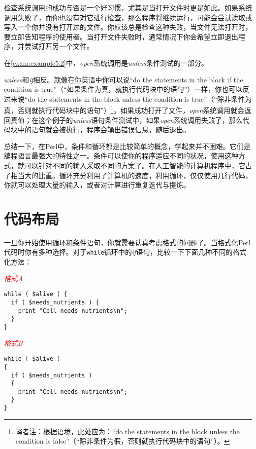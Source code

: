 检查系统调用的成功与否是一个好习惯，尤其是当打开文件时更是如此。如果系统调用失败了，而你也没有对它进行检查，那么程序将继续运行，可能会尝试读取或写入一个你并没有打开过的文件。你应该总是检查这种失败，当文件无法打开时，要立即告知程序的使用者。当打开文件失败时，通常情况下你会希望立即退出程序，并尝试打开另一个文件。

在\autoref{exam:example5.2}中，\textit{open}系统调用是\textit{unless}条件测试的一部分。

\textit{unless}和\textit{if}相反。就像在你英语中你可以说“do the statements in the block if the condition is true”（“如果条件为真，就执行代码块中的语句”）一样，你也可以反过来说“do the statements in the block unless the condition is true”（“除非条件为真，否则就执行代码块中的语句”）\footnote{译者注：根据语境，此处应为：“do the statements in the block unless the condition is false”（“除非条件为假，否则就执行代码块中的语句”）。}。如果成功打开了文件，\textit{open}系统调用就会返回真值；在这个例子的\textit{unless}语句条件测试中，如果\textit{open}系统调用失败了，那么代码块中的语句就会被执行，程序会输出错误信息，随后退出。

总结一下，在Perl中，条件和循环都是比较简单的概念，学起来并不困难。它们是编程语言最强大的特性之一。条件可以使你的程序适应不同的状况，使用这种方式，就可以针对不同的输入采取不同的方案了。在人工智能的计算机程序中，它占了相当大的比重。循环充分利用了计算机的速度，利用循环，仅仅使用几行代码，你就可以处理大量的输入，或者对计算进行重复迭代与提炼。

\section{代码布局}
\label{sect:section5.2}
一旦你开始使用循环和条件语句，你就需要认真考虑格式的问题了。当格式化Perl代码时你有多种选择。对于\verb|while|循环中的\textit{if}语句，比较一下下面几种不同的格式化方法：

\textcolor{red}{\textit{格式A}}
\begin{adjustwidth}{1cm}{}
\begin{lstlisting}
while ( $alive ) {
  if ( $needs_nutrients ) {
    print "Cell needs nutrients\n";
  }
}
\end{lstlisting}
\end{adjustwidth}

\textcolor{red}{\textit{格式B}}
\begin{adjustwidth}{1cm}{}
\begin{lstlisting}
while ( $alive )
{
  if ( $needs_nutrients )
  {
    print "Cell needs nutrients\n";
  }
}
\end{lstlisting}
\end{adjustwidth}

